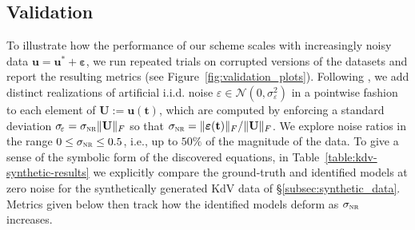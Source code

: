 \documentclass[journal=gmj]{CUP-JNL-DTM}%
\theoremstyle{definition}
\numberwithin{equation}{section}
\begin{document}
\subsection{Validation}\label{subsec:validation}
To illustrate how the performance of our scheme scales with increasingly noisy data $\mathbf{u} = \mathbf{u}^* + \boldsymbol{\varepsilon}$, we run repeated trials on corrupted versions of the datasets and report the resulting metrics (see Figure~\ref{fig:validation_plots}). Following \cite{Messenger.Bortz2021JournalofComputationalPhysics}, we add distinct realizations of artificial i.i.d. noise $\varepsilon \in \mathcal{N}(0,\sigma^2_{\!\varepsilon})$ in a pointwise fashion to each element of $\mathbf{U} := \mathbf{u}(\mathbf{t})$, which are computed by enforcing a standard deviation $\sigma_{\!\varepsilon} = \sigma_{\textsc{nr}} \| \mathbf{U} \|_F$ so that $\sigma_{\textsc{nr}} = \| \boldsymbol{\varepsilon}(\mathbf{t}) \|_F / \| \mathbf{U} \|_F$. We explore noise ratios in the range $0 \leq \sigma_{\textsc{nr}} \leq 0.5$, i.e., up to $50\%$ of the magnitude of the data. To give a sense of the symbolic form of the discovered equations, in Table~\ref{table:kdv-synthetic-results} we explicitly compare the ground-truth and identified models at zero noise for the synthetically generated KdV data of \S\ref{subsec:synthetic_data}. Metrics given below then track how the identified models deform as $\sigma_{\textsc{nr}}$ increases.

\smallskip
\end{document}

